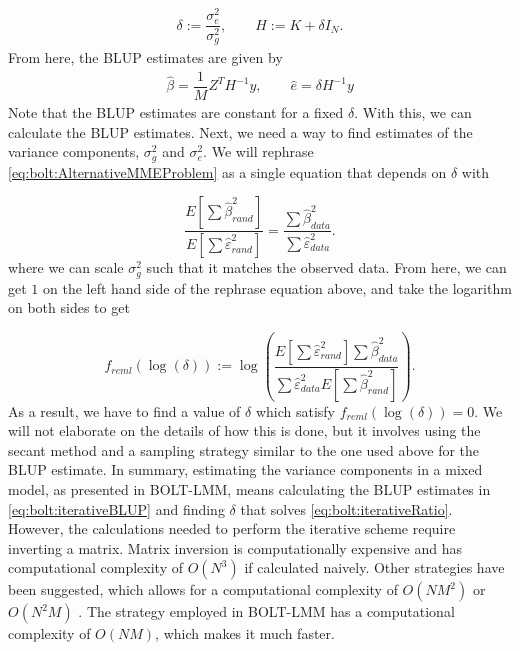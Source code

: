 \begin{align}
	\delta := \dfrac{\sigma_e^2}{\sigma_g^2}, \qquad H := K + \delta I_N.
\end{align}
From here, the BLUP estimates are given by
\begin{align} \label{eq:bolt:iterativeBLUP}
	\hat{\beta} = \dfrac{1}{M}Z^T H^{-1} y,  \qquad  \hat{e} = \delta H^{-1}y
\end{align}
Note that the BLUP estimates are constant for a fixed $ \delta $. With this, we can calculate the BLUP estimates. Next, we need a way to find estimates of the variance components, $ \sigma_g^2 $ and $ \sigma_e^2 $. We will rephrase \cref{eq:bolt:AlternativeMMEProblem} as a single equation that depends on $ \delta $ with 

\begin{equation}
\dfrac
{E\left[ \sum \hat{\beta}^2_{rand} \right]}
{E\left[ \sum \hat{\varepsilon}^2_{rand} \right]}
 =
\dfrac
{\sum \hat{\beta}^2_{data}}
{\sum \hat{\varepsilon}^2_{data}}.
\end{equation}
where we can scale $ \sigma_g^2 $ such that it matches the observed data. From here, we can get $ 1 $ on the left hand side of the rephrase equation above, and take the logarithm on both sides to get

\begin{equation}\label{eq:bolt:iterativeRatio}
f_{reml}(\log(\delta)) 
:= \log 
\left(
\dfrac
{
E\left[ \sum \hat{\varepsilon}^2_{rand} \right]	
\sum \hat{\beta}^2_{data}
}
{
\sum \hat{\varepsilon}^2_{data}
E\left[ \sum \hat{\beta}^2_{rand} \right]
}
\right).
\end{equation}
As a result, we have to find a value of $ \delta $ which satisfy $ f_{reml}(\log(\delta)) = 0$. We will not elaborate on the details of how this is done, but it involves using the secant method and a sampling strategy similar to the one used above for the BLUP estimate. In summary, estimating the variance components in a mixed model, as presented in BOLT-LMM, means calculating the BLUP estimates in \cref{eq:bolt:iterativeBLUP} and finding $ \delta $ that solves \cref{eq:bolt:iterativeRatio}. However, the calculations needed to perform the iterative scheme require inverting a matrix. Matrix inversion is computationally expensive and has computational complexity of $ O(N^3) $ if calculated naively. Other strategies have been suggested, which allows for a computational complexity of $ O(NM^2) $ or $ O(N^2M) $ \cite{svishcheva2012rapid,lippert2011fast}. The strategy employed in BOLT-LMM has a computational complexity of $ O(NM) $, which makes it much faster. 

